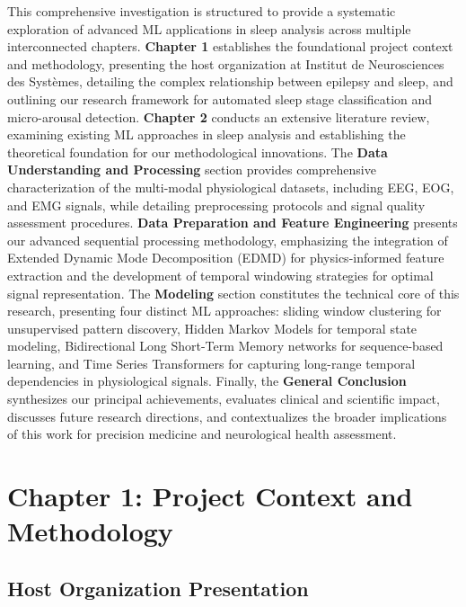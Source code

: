 \documentclass[a4paper,12pt,twoside]{article}
\begin{document}
This comprehensive investigation is structured to provide a systematic exploration of advanced ML applications in sleep analysis across multiple interconnected chapters. \textbf{Chapter 1} establishes the foundational project context and methodology, presenting the host organization at Institut de Neurosciences des Systèmes, detailing the complex relationship between epilepsy and sleep, and outlining our research framework for automated sleep stage classification and micro-arousal detection. \textbf{Chapter 2} conducts an extensive literature review, examining existing ML approaches in sleep analysis and establishing the theoretical foundation for our methodological innovations. The \textbf{Data Understanding and Processing} section provides comprehensive characterization of the multi-modal physiological datasets, including EEG, EOG, and EMG signals, while detailing preprocessing protocols and signal quality assessment procedures. \textbf{Data Preparation and Feature Engineering} presents our advanced sequential processing methodology, emphasizing the integration of Extended Dynamic Mode Decomposition (EDMD) for physics-informed feature extraction and the development of temporal windowing strategies for optimal signal representation. The \textbf{Modeling} section constitutes the technical core of this research, presenting four distinct ML approaches: sliding window clustering for unsupervised pattern discovery, Hidden Markov Models for temporal state modeling, Bidirectional Long Short-Term Memory networks for sequence-based learning, and Time Series Transformers for capturing long-range temporal dependencies in physiological signals. Finally, the \textbf{General Conclusion} synthesizes our principal achievements, evaluates clinical and scientific impact, discusses future research directions, and contextualizes the broader implications of this work for precision medicine and neurological health assessment.

\singlespacing %

\section{Chapter 1: Project Context and Methodology}



\subsection{Host Organization Presentation}
\end{document}
